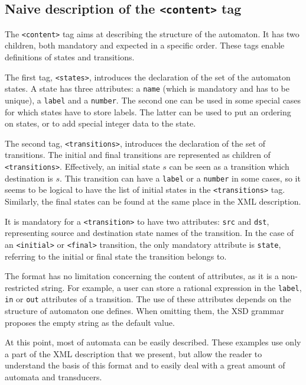 \documentclass[a4paper]{article}
\newcommand{\xtag}[1]{\texttt{<#1>}}
\newcommand{\xattr}[1]{\texttt{#1}}
\begin{document}
\newpage
\subsection{Naive description of the \xtag{content} tag}

The \xtag{content} tag aims at describing the structure of the
automaton. It has two children, both mandatory and expected
in a specific order. These tags enable definitions of states
and transitions.

The first tag, \xtag{states}, introduces the declaration of
the set of the automaton states. A state has three attributes: a
\xattr{name} (which is mandatory and has to be unique), a \xattr{label}
and a \xattr{number}. The second one can be used in some special cases for
which states have to store labels. The latter can be used to put an ordering on
states, or to add special integer data to the state.

The second tag, \xtag{transitions}, introduces the declaration
of the set of transitions. The initial and final
transitions are represented as children of
\xtag{transitions}. Effectively, an initial state $s$ can be seen as a transition
which destination is $s$. This transition can have a \xattr{label} or a
\xattr{number} in some cases, so it seems to be logical to have the list of
initial states in the \xtag{transitions} tag.  Similarly, the final
states can be found at the same place in the XML description.

It is mandatory for a \xtag{transition} to have two attributes:
\xattr{src} and \xattr{dst}, representing source and destination state
names of the
transition. In the case of an \xtag{initial} or \xtag{final} transition,
the only mandatory attribute is \xattr{state}, referring to the initial
or final state the transition belongs to.

The format has no limitation concerning the content of attributes, as
it is a non-restricted string. For example, a user can store a
rational expression in the \xattr{label}, \xattr{in} or \xattr{out}
attributes of a transition. The use of these attributes depends on the
structure of automaton one defines. When omitting them, the XSD
grammar proposes the empty string as the default value.

At this point, most of automata can be easily described. These
examples use only a part of the XML description that we present, but
allow the reader to understand the basis of this format and to easily
deal with a great amount of automata and transducers.
\end{document}
